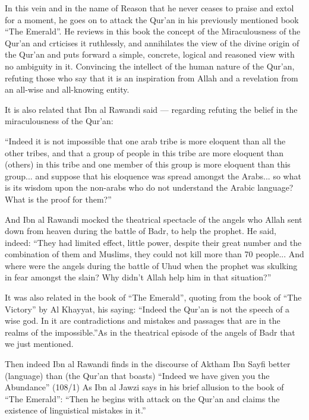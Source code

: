 \documentclass[12pt]{book}
\begin{document}
In this vein and in the name of Reason that he never ceases to praise and extol
for a moment, he goes on to attack the Qur’an in his previously mentioned book
“The Emerald”. He reviews in this book the concept of the Miraculousness of the
Qur’an and crticises it ruthlessly, and annihilates the view of the divine
origin of the Qur’an and puts forward a simple, concrete, logical and reasoned
view with no ambiguity in it. Convincing the intellect of the human nature of
the Qur’an, refuting those who say that it is an inspiration from Allah and a
revelation from an all-wise and all-knowing entity.

It is also related that Ibn al Rawandi said — regarding refuting the belief in
the miraculousness of the Qur’an:

“Indeed it is not impossible that one arab tribe is more eloquent than all the
other tribes, and that a group of people in this tribe are more eloquent than
(others) in this tribe and one member of this group is more eloquent than this
group... and suppose that his eloquence was spread amongst the Arabs... so what
is its wisdom upon the non-arabs who do not understand the Arabic language?
What is the proof for them?”\footnotemark


And Ibn al Rawandi mocked the theatrical spectacle of the angels who Allah sent
down from heaven during the battle of Badr, to help the prophet. He said,
indeed: “They had limited effect, little power, despite their great number and
the combination of them and Muslims, they could not kill more than 70 people...
And where were the angels during the battle of Uhud when the prophet was
skulking in fear amongst the slain? Why didn’t Allah help him in that
situation?”\footnotemark


It was also related in the book of “The Emerald”, quoting from the book of
“The Victory” by Al Khayyat, his saying: “Indeed the Qur’an is not the speech
of a wise god. In it are contradictions and mistakes and passages that are in
the realms of the impossible.”\footnotemark As in the theatrical episode of
the angels of Badr that we just mentioned.


Then indeed Ibn al Rawandi finds in the discourse of Aktham Ibn Sayfi better
(language) than (the Qur’an that boasts) “Indeed we have given you the
Abundance” (108/1)\footnotemark
{}
As Ibn al Jawzi says in his brief allusion to the book of “The Emerald”: “Then
he begins with attack on the Qur’an and claims the existence of linguistical
mistakes in it.”\footnotemark
\end{document}
